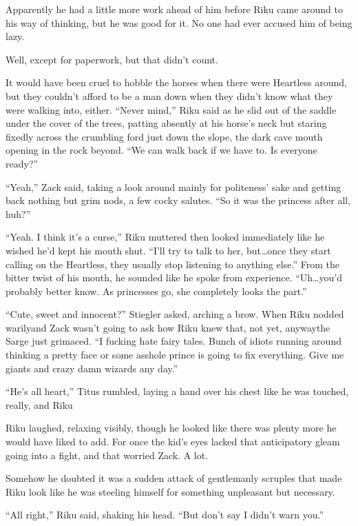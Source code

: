 Apparently he had a little more work ahead of him before Riku came around to his way of thinking, but he was good for it. No one had ever accused him of being lazy.

Well, except for paperwork, but that didn't count.

It would have been cruel to hobble the horses when there were Heartless around, but they couldn't afford to be a man down when they didn't know what they were walking into, either. ``Never mind,'' Riku said as he slid out of the saddle under the cover of the trees, patting absently at his horse's neck but staring fixedly across the crumbling ford just down the slope, the dark cave mouth opening in the rock beyond. ``We can walk back if we have to. Is everyone ready?''

``Yeah,'' Zack said, taking a look around mainly for politeness' sake and getting back nothing but grim nods, a few cocky salutes. ``So it was the princess after all, huh?''

``Yeah. I think it's a curse,'' Riku muttered then looked immediately like he wished he'd kept his mouth shut. ``I'll try to talk to her, but\ldots once they start calling on the Heartless, they usually stop listening to anything else.'' From the bitter twist of his mouth, he sounded like he spoke from experience. ``Uh\ldots you'd probably better know. As princesses go, she completely looks the part.''

``Cute, sweet and innocent?'' Stiegler asked, arching a brow. When Riku nodded warily\textemdash and Zack wasn't going to ask how Riku knew that, not yet, anyway\textemdash the Sarge just grimaced. ``I fucking hate fairy tales. Bunch of idiots running around thinking a pretty face or some asshole prince is going to fix everything. Give me giants and crazy damn wizards any day.''

``He's all heart,'' Titus rumbled, laying a hand over his chest like he was touched, really, and Riku\textemdash 

Riku laughed, relaxing visibly, though he looked like there was plenty more he would have liked to add. For once the kid's eyes lacked that anticipatory gleam going into a fight, and that worried Zack. A lot.

Somehow he doubted it was a sudden attack of gentlemanly scruples that made Riku look like he was steeling himself for something unpleasant but necessary.

``All right,'' Riku said, shaking his head. ``But don't say I didn't warn you.''


